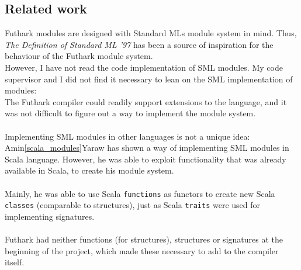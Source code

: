 \subsection{Related work}
Futhark modules are designed with Standard MLs module system in mind. Thus, 
\textit{The Definition of Standard ML '97} \citep{sml_book} has been a source of inspiration
for the behaviour of the Futhark module system. \\
However, I have not read the code implementation of SML modules. My code supervisor and I did not find it necessary to lean on the SML implementation of modules:\\
The Futhark compiler could readily support extensions to the language, and it was not difficult to
figure out a way to implement the module system.
\\
\\
Implementing SML modules in other languages is not a unique idea:\\
Amin\ref{scala_modules}Yaraw has shown a way of implementing SML modules in Scala
language. However, he was able to exploit functionality that was already available in
Scala, to create his module system.
\\
\\
Mainly, he was able to use Scala \texttt{functions} as functors to create new Scala
\texttt{classes} (comparable to structures), just as Scala
\texttt{traits} were used for implementing signatures.
\\
\\
Futhark had neither functions (for structures), structures or signatures at the
beginning of the project, which made these necessary to add to the compiler itself.